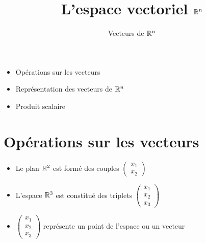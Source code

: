 







\title{{\bf L'espace vectoriel $\mathbb{R}^n$}}
\subtitle{Vecteurs de $\mathbb{R}^n$}

\begin{frame}
  
  \debutmontitre

  \pause

{\footnotesize
\hfill
{}
\begin{minipage}{0.6\textwidth}
  \begin{itemize}
    \item<3-> Opérations sur les vecteurs
    \item<4-> Représentation des vecteurs de $\mathbb{R}^n$
    \item<5-> Produit scalaire 
  \end{itemize}
\end{minipage}
}

\end{frame}

\setcounter{framenumber}{0}


\section{Opérations sur les vecteurs}

\begin{frame}
\begin{itemize}
  
  \item Le plan $\mathbb{R}^2$ est formé des couples 
  $\left(\begin{smallmatrix}x_1\\  x_2\end{smallmatrix}\right)$

  \pause
  
  \item L'espace $\mathbb{R}^3$ est constitué des triplets 
  $\left(\begin{smallmatrix}x_1\\x_2\\x_3\end{smallmatrix}\right)$
  
  \pause
  
  \item $\left(\begin{smallmatrix}x_1\\x_2\\x_3\end{smallmatrix}\right)$ représente
  un point de l'espace ou un vecteur

  \bigskip
  
\end{itemize}
\end{frame}


